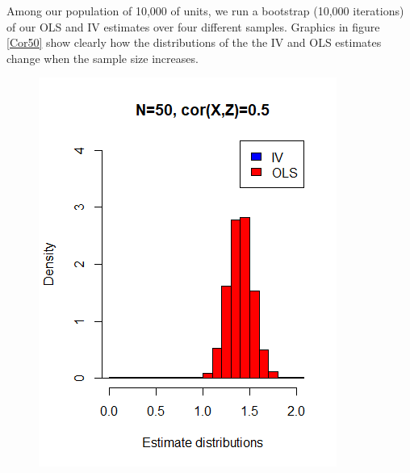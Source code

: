 \documentclass[a4paper,12pt,oneside,English]{article}
\begin{document}
Among our population of 10,000 of units, we run a bootstrap (10,000 iterations) of our OLS and IV estimates over four different samples.
Graphics in figure \ref{Cor50} show clearly how the distributions of the the IV and OLS estimates change when the sample size increases.

\begin{figure}[p!]
    \begin{minipage}[b]{0.5\linewidth}
        \includegraphics[width=\linewidth]{Fig1.png}
    \end{minipage}
    \begin{minipage}[b]{0.5\linewidth}

\end{minipage}
\end{figure}
\end{document}
